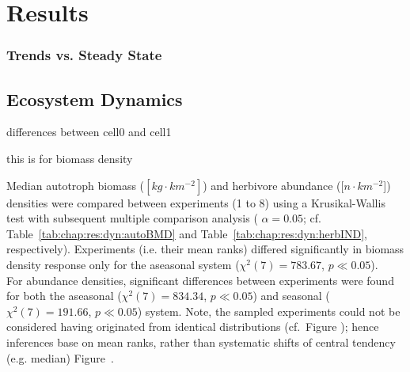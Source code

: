 \chapter{Results}
\label{chap:res}


\subsection{Trends vs. Steady State}
\label{chap:res:dyn:trend}

\section{Ecosystem Dynamics}
\label{chap:res:dyn} 
differences between cell0 and cell1


this is for biomass density



Median autotroph biomass ($[kg\cdot km^{-2}]$) and herbivore abundance ($[n\cdot km^{-2}$]) densities were compared between experiments (1 to 8) using a Krusikal-Wallis test with subsequent multiple comparison analysis ( $\alpha = 0.05$; cf. Table~\ref{tab:chap:res:dyn:autoBMD} and Table~\ref{tab:chap:res:dyn:herbIND}, respectively). 
Experiments (i.e. their mean ranks) differed significantly in biomass density response only for the aseasonal  system ($\chi^{2}(7) = 783.67$, $p \ll 0.05$). 
\\
For abundance densities, significant differences between experiments were found for both the aseasonal ($\chi^{2}(7) = 834.34$, $p \ll 0.05$) and seasonal ($\chi^{2}(7) = 191.66$, $p \ll 0.05$) system. 
Note, the sampled experiments could not be considered having originated from identical distributions (cf.~Figure ); 
hence inferences base on mean ranks, rather than systematic shifts of central tendency (e.g. median) Figure~.




%
%